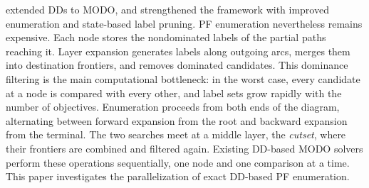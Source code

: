 \documentclass[letterpaper]{article}
\begin{document}
\citet{bergman2016multiobjective} extended DDs to MODO, and \citet{bergman2022network} strengthened the framework with improved enumeration and state-based label pruning. PF enumeration nevertheless remains expensive. Each node stores the nondominated labels of the partial paths reaching it. Layer expansion generates labels along outgoing arcs, merges them into destination frontiers, and removes dominated candidates. This dominance filtering is the main computational bottleneck: in the worst case, every candidate at a node is compared with every other, and label sets grow rapidly with the number of objectives. Enumeration proceeds from both ends of the diagram, alternating between forward expansion from the root and backward expansion from the terminal. The two searches meet at a middle layer, the \emph{cutset}, where their frontiers are combined and filtered again. Existing DD-based MODO solvers perform these operations sequentially, one node and one comparison at a time.
This paper investigates the parallelization of exact DD-based PF enumeration. 
\end{document}
